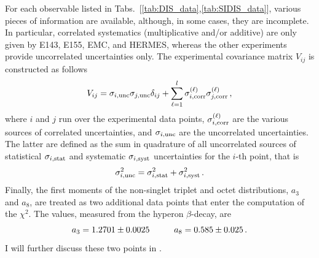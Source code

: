 For each observable listed in Tabs.~[\ref{tab:DIS_data},\ref{tab:SIDIS_data}], various pieces of information are available, although, in some cases, they are incomplete. In particular, correlated systematics (multiplicative and/or additive) are only given by E143, E155, EMC, and HERMES, whereas the other experiments provide uncorrelated uncertainties only. The experimental covariance matrix $V_{ij}$ is constructed as follows
\begin{equation}
  V_{ij} =  \sigma_{i,\textrm{unc}} \sigma_{j,\textrm{unc}} \delta_{ij} + \sum_{\ell=1}^{l} \sigma_{i,\textrm{corr}}^{(\ell)} \sigma_{j,\textrm{corr}}^{(\ell)} \,,
  \label{eq:covariance_matrix}
\end{equation}
where $i$ and $j$ run over the experimental data points, $\sigma_{i,\textrm{corr}}^{(\ell)}$ are the various sources of correlated uncertainties, and $\sigma_{i,\textrm{unc}}$ are the uncorrelated uncertainties. The latter are defined as the sum in quadrature of all uncorrelated sources of statistical $\sigma_{i,\textrm{stat}}$ and systematic $\sigma_{i,\textrm{syst}}$ uncertainties for the $i$-th point, that is
\begin{equation}
  \sigma_{i,\textrm{unc}}^2 = \sigma_{i,\textrm{stat}}^2 + \sigma_{i,\textrm{syst}}^2 \,.
\end{equation}
Finally, the first moments of the non-singlet triplet and octet distributions, $a_3$ and $a_8$, are treated as two additional data points that enter the computation of the $\chi^2$. The values, measured from the hyperon $\beta$-decay, are \cite{Nakamura_2010}
\begin{equation}
  a_3 = 1.2701 \pm 0.0025 \hspace{10mm} a_8 = 0.585 \pm 0.025 \,.
  \label{eq:a3_a8_values}
\end{equation}
I will further discuss these two points in .

